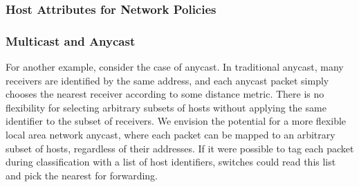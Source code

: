 \subsubsection{Host Attributes for Network Policies}


\subsubsection{Multicast and Anycast}
For another example, consider the case of anycast. In traditional anycast, many receivers are identified by the same address, and each anycast packet simply chooses the nearest receiver according to some distance metric. There is no flexibility for selecting arbitrary subsets of hosts without applying the same identifier to the subset of receivers. We envision the potential for a more flexible local area network anycast, where each packet can be mapped to an arbitrary subset of hosts, regardless of their addresses. If it were possible to tag each packet during classification with a list of host identifiers, switches could read this list and pick the nearest for forwarding.